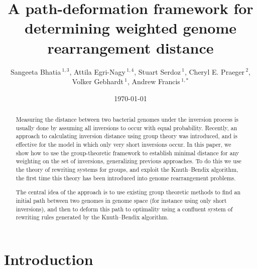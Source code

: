 \documentclass[utf8]{Frontiers_LaTex_Templates/frontiersFPHY} %
\numberwithin{equation}{section}
\def\firstAuthorLast{Bhatia {et~al.}}
\def\Authors{Sangeeta Bhatia\,$^{1,3}$, Attila Egri-Nagy\,$^{1,4}$, Stuart Serdoz\,$^{1}$, Cheryl E. Praeger\,$^{2}$, Volker Gebhardt\,$^{1}$, Andrew Francis\,$^{1,*}$}
\begin{document}
\onecolumn
{}

\title[Weighted genome rearrangement distance]{A path-deformation framework for determining weighted genome rearrangement distance}

\author[\firstAuthorLast ]{\Authors} %
\address{} %
\correspondance{} %

\extraAuth{}
\maketitle
\begin{abstract}
Measuring the distance between two bacterial genomes under the inversion process is usually done by assuming all inversions to occur with equal probability.  Recently, an approach to calculating inversion distance using group theory was introduced, and is effective for the model in which only very short inversions occur.  In this paper, we show how to use the group-theoretic framework to establish minimal distance for any weighting on the set of inversions, generalizing previous approaches.  To do this we use the theory of rewriting systems for groups, and exploit the Knuth--Bendix algorithm, the first time this theory has been introduced into genome rearrangement problems.  

The central idea of the approach is to use existing group theoretic methods to find an initial path between two genomes in genome space (for instance using only short inversions), and then to deform this path to optimality using a confluent system of rewriting rules generated by the Knuth--Bendix algorithm.
\end{abstract}
\date{\today}


\section{Introduction}
\label{sec:intro}
\end{document}
